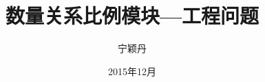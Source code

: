 \documentclass[10pt]{beamer}
\title{数量关系比例模块---工程问题}
\author{宁颖丹}
\date{2015年12月}
\begin{document}
\small
\begin{frame}
  \titlepage
\end{frame}





\end{document}
